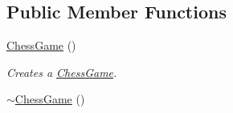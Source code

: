 \subsection*{Public Member Functions}
\begin{DoxyCompactItemize}
\item 
\hyperlink{classChessGame_a7c9d1caa97c7ca5737f187a6066662b2}{ChessGame} ()
\begin{DoxyCompactList}\small\item\em Creates a \hyperlink{classChessGame}{ChessGame}. \item\end{DoxyCompactList}\item 
\hypertarget{classChessGame_a9c7f4475dcd31ab4e1f98f033fb0c60f}{
\hyperlink{classChessGame_a9c7f4475dcd31ab4e1f98f033fb0c60f}{$\sim$ChessGame} ()}
\label{classChessGame_a9c7f4475dcd31ab4e1f98f033fb0c60f}


\end{DoxyCompactItemize}
